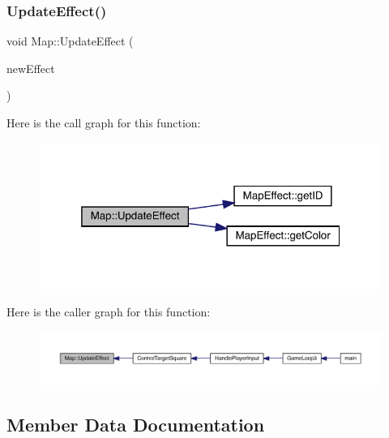 \mbox{\label{class_map_a7ba59d3c72accc7e8af4624f8e0abe69}} 
\subsubsection{\texorpdfstring{Update\+Effect()}{UpdateEffect()}}
{\footnotesize\ttfamily void Map\+::\+Update\+Effect (\begin{DoxyParamCaption}\item[{\mbox{\hyperlink{class_map_effect}{Map\+Effect}}}]{new\+Effect }\end{DoxyParamCaption})}

Here is the call graph for this function\+:\nopagebreak
\begin{figure}[H]
\begin{center}
\leavevmode
\includegraphics[width=319pt]{dd/d11/class_map_a7ba59d3c72accc7e8af4624f8e0abe69_cgraph}
\end{center}
\end{figure}
Here is the caller graph for this function\+:\nopagebreak
\begin{figure}[H]
\begin{center}
\leavevmode
\includegraphics[width=350pt]{dd/d11/class_map_a7ba59d3c72accc7e8af4624f8e0abe69_icgraph}
\end{center}
\end{figure}


\subsection{Member Data Documentation}
\mbox{\label{class_map_adba7c06f06362ce22f16be96a723dcaf}} 
